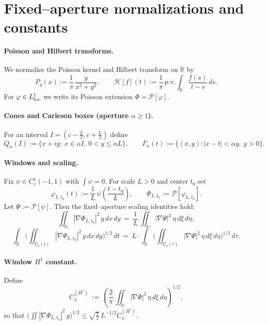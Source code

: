 
\section*{Fixed–aperture normalizations and constants}

\paragraph{Poisson and Hilbert transforms.}
We normalize the Poisson kernel and Hilbert transform on $\mathbb{R}$ by
\[P_y(x):=\frac{1}{\pi}\,\frac{y}{x^2+y^2},\qquad \mathcal H[f](t):=\frac{1}{\pi}\,\mathrm{p.v.}\int_{\mathbb{R}} \frac{f(s)}{t-s}\,ds.\]
For $\varphi\in L^1_{\rm loc}$ we write its Poisson extension $\Phi=\mathcal P[\varphi]$.

\paragraph{Cones and Carleson boxes (aperture $\alpha\ge1$).}
For an interval $I=(c-\tfrac{L}{2},c+\tfrac{L}{2})$ define
\[Q_\alpha(I):=\{x+iy:\ x\in \alpha I,\ 0<y\le \alpha L\},\qquad
\Gamma_\alpha(t):=\{(x,y): |x-t|<\alpha y,\ y>0\}.\]

\paragraph{Windows and scaling.}
Fix $\psi\in C^1_c(-1,1)$ with $\int\psi=0$. For scale $L>0$ and center $t_0$ set
\[\varphi_{L,t_0}(t):=\frac{1}{L}\,\psi\!\left(\frac{t-t_0}{L}\right),\qquad \Phi_{L,t_0}:=\mathcal P[\varphi_{L,t_0}].\]
Let $\Psi:=\mathcal P[\psi]$. Then the fixed–aperture scaling identities hold:
\[\iint_{\mathbb{H}} |\nabla \Phi_{L,t_0}|^2\,y\,dx\,dy\ =\ \frac{1}{L}\,\iint_{\mathbb{H}} |\nabla \Psi|^2\,\eta\,d\xi\,d\eta,\]
\[\int_{\mathbb{R}}\!\Big(\iint_{\Gamma_\alpha(t)} |\nabla \Phi_{L,t_0}|^2\,y\,dx\,dy\Big)^{1/2}\,dt\ =\ L\cdot \int_{\mathbb{R}}\!\Big(\iint_{\Gamma_\alpha(\tau)} |\nabla \Psi|^2\,\eta\,d\xi\,d\eta\Big)^{1/2}\,d\tau.\]

\paragraph{Window $H^1$ constant.}
Define
\[C_\psi^{(H^1)}\ :=\ \left(\frac{2}{\pi}\,\iint_{\mathbb{H}} |\nabla \Psi|^2\,\eta\,d\xi\,d\eta\right)^{1/2},\]
so that $\big(\iint |\nabla \Phi_{L,t_0}|^2\,y\big)^{1/2}\le \sqrt{\tfrac{\pi}{2}}\,L^{-1/2} C_\psi^{(H^1)}$.

